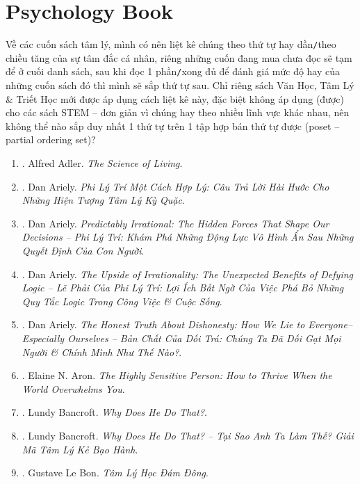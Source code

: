 \documentclass{article}
\begin{document}
\section{Psychology Book}
Về các cuốn sách tâm lý, mình có nên liệt kê chúng theo thứ tự hay dần\texttt{/}theo chiều tăng của sự tâm đắc cá nhân, riêng những cuốn đang mua chưa đọc sẽ tạm để ở cuối danh sách, sau khi đọc 1 phần\texttt{/}xong đủ để đánh giá mức độ hay của những cuốn sách đó thì mình sẽ sắp thứ tự sau. Chỉ riêng sách Văn Học, Tâm Lý \& Triết Học mới được áp dụng cách liệt kê này, đặc biệt không áp dụng (được) cho các sách STEM -- đơn giản vì chúng hay theo nhiều lĩnh vực khác nhau, nên không thể nào sắp duy nhất 1 thứ tự trên 1 tập hợp bán thứ tự được (poset -- partial ordering set)?
\begin{enumerate}
	\item \cite{Adler2013}. Alfred Adler. {\it The Science of Living}.\hfill{\sf[done]}
	\item \cite{Ariely_reasonably_irrational}. Dan Ariely. {\it Phi Lý Trí Một Cách Hợp Lý: Câu Trả Lời Hài Hước Cho Những Hiện Tượng Tâm Lý Kỳ Quặc}.\hfill{\sf[done]}
	\item \cite{Ariely_predictably_irrational}. Dan Ariely. {\it Predictably Irrational: The Hidden Forces That Shape Our Decisions -- Phi Lý Trí: Khám Phá Những Động Lực Vô Hình Ẩn Sau Những Quyết Định Của Con Người}.\hfill{\sf[done]}
	\item \cite{Ariely_upside_rationality}. Dan Ariely. {\it The Upside of Irrationality: The Unexpected Benefits of Defying Logic -- Lẽ Phải Của Phi Lý Trí: Lợi Ích Bất Ngờ Của Việc Phá Bỏ Những Quy Tắc Logic Trong Công Việc \& Cuộc Sống}.\hfill{\sf[done]}
	\item \cite{Ariely_dishonesty}. Dan Ariely. {\it The Honest Truth About Dishonesty: How We Lie to Everyone--Especially Ourselves -- Bản Chất Của Dối Trá: Chúng Ta Đã Dối Gạt Mọi Người \& Chính Mình Như Thế Nào?}.\hfill{\sf[done]}
	\item \cite{Aron2013}. Elaine N. Aron. {\it The Highly Sensitive Person: How to Thrive When the World Overwhelms You}.\hfill{\sf[done]}
	\item \cite{Bancroft2003}. Lundy Bancroft. {\it Why Does He Do That?}.\hfill{\sf[reading]}
	\item \cite{Bancroft2019}. Lundy Bancroft. {\it Why Does He Do That? -- Tại Sao Anh Ta Làm Thế? Giải Mã Tâm Lý Kẻ Bạo Hành}.\hfill{\sf[done]}
	\item \cite{Bon2022}. Gustave Le Bon. {\it Tâm Lý Học Đám Đông}.\hfill{\sf[done]}

\end{enumerate}
\end{document}
